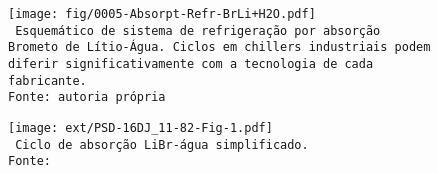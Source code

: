     \begin{frame}\vspace*{-0em}
        \begin{center}
            \begin{figure}
                \fontsize{5.0}{5}\selectfont
                \texttt{[image: fig/0005-Absorpt-Refr-BrLi+H2O.pdf]}
                \\\vspace*{-0.0em}\texttt{%
                    Esquemático de sistema de refrigeração por absorção Brometo de Lítio-Água.
                    Ciclos em chillers industriais podem diferir significativamente com a
                    tecnologia de cada fabricante.\\
                    Fonte: autoria própria
                }
            \end{figure}
        \end{center}
    \end{frame}
    \begin{frame}\vspace*{-0em}
    \end{frame}
    \begin{frame}\vspace*{-0em}
        \begin{center}
            \begin{figure}
                \fontsize{5.0}{5}\selectfont
                \texttt{[image: ext/PSD-16DJ\_11-82-Fig-1.pdf]}
                \\\vspace*{-0.0em}\texttt{%
                    Ciclo de absorção LiBr-água simplificado.\\
                   Fonte: 
                }
            \end{figure}
        \end{center}
    \end{frame}

